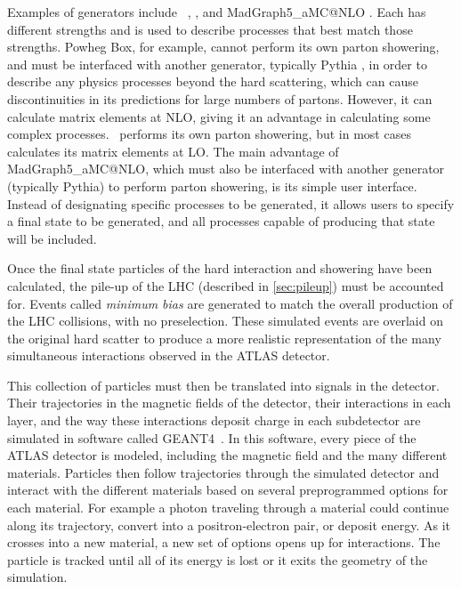 Examples of generators include \sherpa~\cite{sherpa},  \cite{PowhegBOX1,PowhegBOX2,PowhegBOX3}, and {\sc MadGraph5\_aMC@NLO} \cite{Alwall:2014hca}. Each has different strengths and is used to describe processes that best match those strengths. {\sc Powheg Box}, for example, cannot perform its own parton showering, and must be interfaced with another generator, typically {\sc Pythia} \cite{Sjostrand:2006za}, in order to describe any physics processes beyond the hard scattering, which can cause discontinuities in its predictions for large numbers of partons. However, it can calculate matrix elements at \ac{NLO}, giving it an advantage in calculating some complex processes. \sherpa~performs its own parton showering, but in most cases calculates its matrix elements at \ac{LO}. The main advantage of {\sc MadGraph5\_aMC@NLO}, which must also be interfaced with another generator (typically {\sc Pythia}) to perform parton showering, is its simple user interface. Instead of designating specific processes to be generated, it allows users to specify a final state to be generated, and all processes capable of producing that state will be included.

Once the final state particles of the hard interaction and showering have been calculated, the pile-up of the \ac{LHC} (described in \autoref{sec:pileup}) must be accounted for. Events called \textit{minimum bias} are generated to match the overall production of the \ac{LHC} collisions, with no preselection. These simulated events are overlaid on the original hard scatter to produce a more realistic representation of the many simultaneous interactions observed in the \ac{ATLAS} detector.

This collection of particles must then be translated into signals in the detector. Their trajectories in the magnetic fields of the detector, their interactions in each layer, and the way these interactions deposit charge in each subdetector are simulated in software called {\sc GEANT4}~\cite{Agostinelli:2002hh}. In this software, every piece of the \ac{ATLAS} detector is modeled, including the magnetic field and the many different materials. Particles then follow trajectories through the simulated detector and interact with the different materials based on several preprogrammed options for each material. For example a photon traveling through a material could continue along its trajectory, convert into a positron-electron pair, or deposit energy. As it crosses into a new material, a new set of options opens up for interactions. The particle is tracked until all of its energy is lost or it exits the geometry of the simulation.

